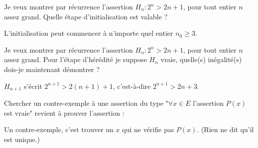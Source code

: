 \begin{question}

\qkeeporder

Je veux montrer par récurrence l'assertion $H_n : 2^n > 2n+1$, pour tout entier $n$ assez grand. Quelle étape d'initialisation est valable ?
\begin{answers}



\end{answers}
\begin{explanations}
L'initialisation peut commencer à n'importe quel entier $n_0 \ge 3$.
\end{explanations}
\end{question}


\begin{question}

Je veux montrer par récurrence l'assertion $H_n : 2^n > 2n+1$, pour tout entier $n$ assez grand. Pour l'étape d'hérédité je suppose $H_n$ vraie, quelle(s) inégalité(s) dois-je maintenant démontrer ?
\begin{answers}
    


\end{answers}
\begin{explanations}
$H_{n+1}$ s'écrit $2^{n+1} > 2(n+1)+1$, c'est-à-dire $2^{n+1} > 2n+3$.
\end{explanations}
\end{question}


\begin{question}

Chercher un contre-exemple à une assertion du type 
"$\forall x \in E$ l'assertion $P(x)$ est vraie" revient à prouver l'assertion :
\begin{answers}

    
    
\end{answers}
\begin{explanations}
Un contre-exemple, c'est trouver un $x$ qui ne vérifie pas $P(x)$. (Rien ne dit qu'il est unique.)
\end{explanations}
\end{question}



